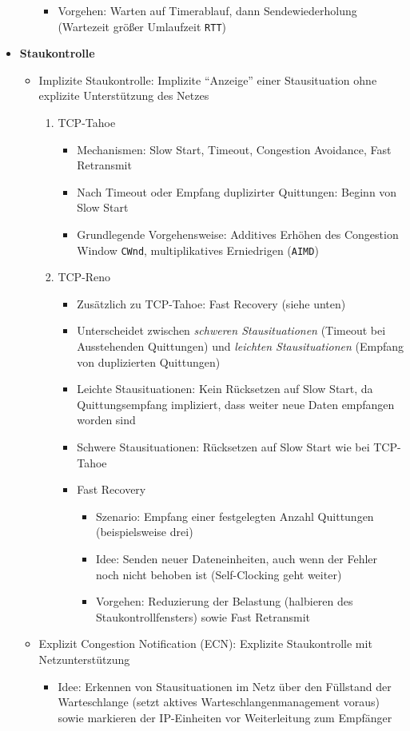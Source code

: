 \begin{itemize}
\begin{itemize}
\begin{itemize}
			\item Vorgehen: Warten auf Timerablauf, dann Sendewiederholung (Wartezeit größer Umlaufzeit \texttt{RTT})
		\end{itemize}
	\end{itemize}
	\item \textbf{Staukontrolle}
	\begin{itemize}
		\item Implizite Staukontrolle: Implizite "`Anzeige"' einer Stausituation ohne explizite Unterstützung des Netzes
		\begin{enumerate}
			\item TCP-Tahoe
			\begin{itemize}
				\item Mechanismen: Slow Start, Timeout, Congestion Avoidance, Fast Retransmit
				\item Nach Timeout oder Empfang duplizirter Quittungen: Beginn von Slow Start
				\item Grundlegende Vorgehensweise: Additives Erhöhen des Congestion Window \texttt{CWnd}, multiplikatives Erniedrigen (\texttt{AIMD})
			\end{itemize}
			\item TCP-Reno
			\begin{itemize}
				\item Zusätzlich zu TCP-Tahoe: Fast Recovery (siehe unten)
				\item Unterscheidet zwischen \textit{schweren Stausituationen} (Timeout bei Ausstehenden Quittungen) und \textit{leichten Stausituationen} (Empfang von duplizierten Quittungen)
				\item Leichte Stausituationen: Kein Rücksetzen auf Slow Start, da Quittungsempfang impliziert, dass weiter neue Daten empfangen worden sind
				\item Schwere Stausituationen: Rücksetzen auf Slow Start wie bei TCP-Tahoe
				\item Fast Recovery
				\begin{itemize}
					\item Szenario: Empfang einer festgelegten Anzahl Quittungen (beispielsweise drei)
					\item Idee: Senden neuer Dateneinheiten, auch wenn der Fehler noch nicht behoben ist (Self-Clocking geht weiter)
					\item Vorgehen: Reduzierung der Belastung (halbieren des Staukontrollfensters) sowie Fast Retransmit
				\end{itemize}
			\end{itemize}
		\end{enumerate}
		\item Explizit Congestion Notification (ECN): Explizite Staukontrolle mit Netzunterstützung
		\begin{itemize}
			\item Idee: Erkennen von Stausituationen im Netz über den Füllstand der Warteschlange (setzt aktives Warteschlangenmanagement voraus) sowie markieren der IP-Einheiten vor Weiterleitung zum Empfänger
		\end{itemize}
	\end{itemize}
\end{itemize}

